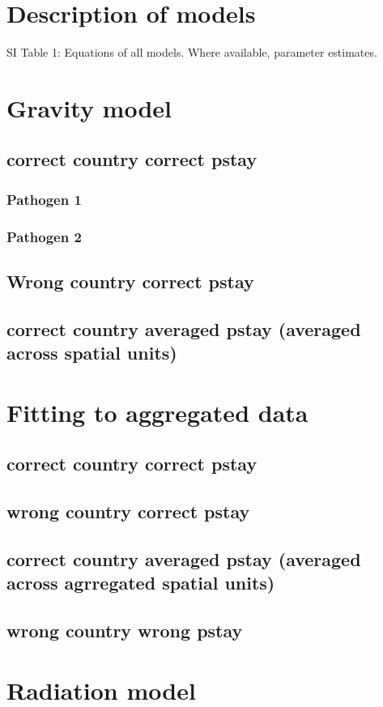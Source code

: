 \documentclass[a4paper,12pt]{article}
\begin{document}
\tableofcontents{}
\section{Description of models}
SI Table 1: Equations of all models. Where available, parameter
estimates.
\section{Gravity model}
\subsection{correct country correct pstay}
\subsubsection{Pathogen 1}
\subsubsection{Pathogen 2}
\subsection{Wrong country correct pstay}
\subsection{correct country averaged pstay (averaged across spatial
  units)}
\section{Fitting to aggregated data}
\subsection{correct country correct pstay}
\subsection{wrong country correct pstay}
\subsection{correct country averaged pstay (averaged across agrregated
  spatial units)}
\subsection{wrong country wrong pstay}
\section{Radiation model}
\end{document}
